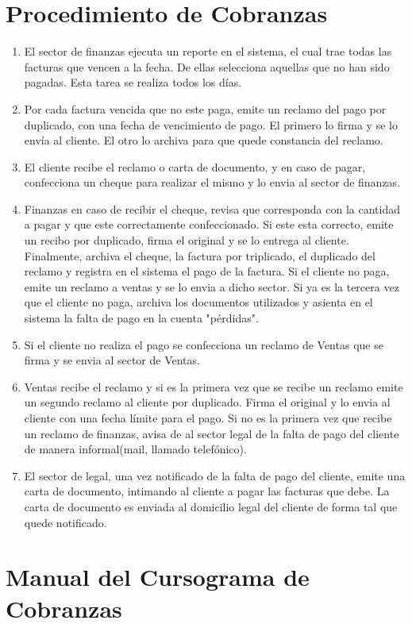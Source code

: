 \section{Procedimiento de Cobranzas}
\begin{enumerate}
  \item El sector de finanzas ejecuta un reporte en el sistema, el cual trae todas las facturas que vencen a la fecha. De ellas selecciona aquellas que no han sido pagadas. Esta tarea se realiza todos los días.
  \item Por cada factura vencida que no este paga, emite un reclamo del pago por duplicado, con una fecha de vencimiento de pago. El primero lo firma y se lo envía al cliente. El otro lo archiva para que quede constancia del reclamo.
  \item El cliente recibe el reclamo o carta de documento, y en caso de pagar, confecciona un cheque para realizar el mismo y lo envia al sector de finanzas.
  \item Finanzas en caso de recibir el cheque, revisa que corresponda con la cantidad a pagar y que este correctamente confeccionado. Si este esta correcto, emite un recibo por duplicado, firma el original y se lo entrega al cliente. Finalmente, archiva el cheque, la factura por triplicado, el duplicado del reclamo y registra en el sistema el pago de la factura.
  Si el cliente no paga, emite un reclamo a ventas y se lo envia a dicho sector. Si ya es la tercera vez que el cliente no paga, archiva los documentos utilizados y asienta en el sistema la falta de pago en la cuenta "pérdidas". 
  \item Si el cliente no realiza el pago se confecciona un reclamo de Ventas que se firma y se envia al sector de Ventas.
  \item Ventas recibe el reclamo y si es la primera vez que se recibe un reclamo emite un segundo reclamo al cliente por duplicado. Firma el original y lo envia al cliente con una fecha límite para el pago. Si no es la primera vez que recibe un reclamo de finanzas, avisa de al sector legal de la falta de pago del cliente de manera informal(mail, llamado telefónico).
  \item El sector de legal, una vez notificado de la falta de pago del cliente, emite una carta de documento, intimando al cliente a pagar las facturas que debe. La carta de documento es enviada al domicilio legal del cliente de forma tal que quede notificado.
\end{enumerate}

\pagebreak
\section{Manual del Cursograma de Cobranzas}


